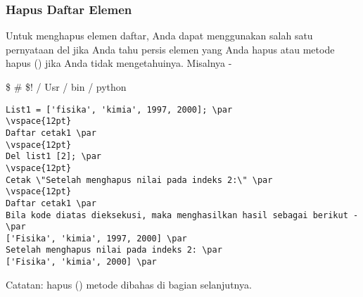 \subsubsection{Hapus Daftar Elemen}
\vspace{12pt}
Untuk menghapus elemen daftar, Anda dapat menggunakan salah satu pernyataan del jika Anda tahu persis elemen yang Anda hapus atau metode hapus () jika Anda tidak mengetahuinya. Misalnya - \par
\vspace{12pt}
 \$  \#  \$! / Usr / bin / python \par
\vspace{12pt}
\begin{verbatim}
List1 = ['fisika', 'kimia', 1997, 2000]; \par
\vspace{12pt}
Daftar cetak1 \par
\vspace{12pt}
Del list1 [2]; \par
\vspace{12pt}
Cetak \"Setelah menghapus nilai pada indeks 2:\" \par
\vspace{12pt}
Daftar cetak1 \par
Bila kode diatas dieksekusi, maka menghasilkan hasil sebagai berikut - \par
['Fisika', 'kimia', 1997, 2000] \par
Setelah menghapus nilai pada indeks 2: \par
['Fisika', 'kimia', 2000] \par
\end{verbatim}
Catatan: hapus () metode dibahas di bagian selanjutnya. \par
